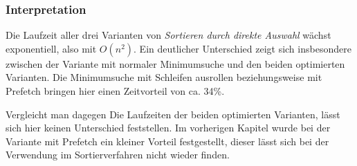 \subsubsection{Interpretation}

Die Laufzeit aller drei Varianten von \textit{Sortieren durch direkte Auswahl} wächst exponentiell, also mit $O(n^2)$. Ein deutlicher Unterschied zeigt sich insbesondere zwischen der Variante mit normaler Minimumsuche und den beiden optimierten Varianten. Die Minimumsuche mit Schleifen ausrollen beziehungsweise mit Prefetch bringen hier einen Zeitvorteil von ca. 34\%.

Vergleicht man dagegen Die Laufzeiten der beiden optimierten Varianten, lässt sich hier keinen Unterschied feststellen. Im vorherigen Kapitel wurde bei der Variante mit Prefetch ein kleiner Vorteil festgestellt, dieser lässt sich bei der Verwendung im Sortierverfahren nicht wieder finden.

